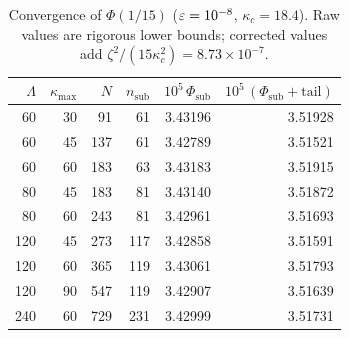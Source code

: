 \begin{table}[ht]\centering\small
\caption{Convergence of \(\Phi(1/15)\) (\(\varepsilon=10^{-8}\), \(\kappa_c=18.4\)). Raw values are rigorous lower bounds; corrected values add \(\zeta^2/(15\kappa_c^2)=8.73\times10^{-7}\).}\label{tab:convergence}
\begin{tabular}{rrrr r r}\toprule
\(\Lambda\) & \(\kappa_{\max}\) & \(N\) & \(n_{\mathrm{sub}}\) & \(10^5\,\Phi_{\mathrm{sub}}\) & \(10^5\,(\Phi_{\mathrm{sub}}+\text{tail})\) \\\midrule
60 & 30 & 91 & 61 & 3.43196 & 3.51928 \\
60 & 45 & 137 & 61 & 3.42789 & 3.51521 \\
60 & 60 & 183 & 63 & 3.43183 & 3.51915 \\
80 & 45 & 183 & 81 & 3.43140 & 3.51872 \\
80 & 60 & 243 & 81 & 3.42961 & 3.51693 \\
120 & 45 & 273 & 117 & 3.42858 & 3.51591 \\
120 & 60 & 365 & 119 & 3.43061 & 3.51793 \\
120 & 90 & 547 & 119 & 3.42907 & 3.51639 \\
240 & 60 & 729 & 231 & 3.42999 & 3.51731 \\
\bottomrule\end{tabular}\end{table}
